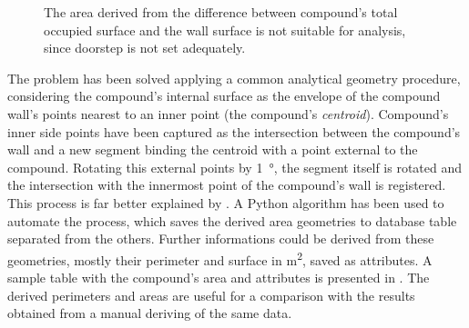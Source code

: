             \begin{figure}[H]
                \centering
                \hspace{0.1\textwidth}
                \hspace{0.1\textwidth}
                \caption[Deriving compound area from difference between total occupied surface and wall surface]{The area derived from the difference between compound's total occupied surface and the wall surface is not suitable for analysis, since doorstep is not set adequately.}
                \label{fig:comp}
            \end{figure}

            The problem has been solved applying a common analytical geometry procedure, considering the compound's internal surface as the envelope of the compound wall's points nearest to an inner point (the compound's \emph{centroid}). Compound's inner side points have been captured as the intersection between the compound's wall and a new segment binding the centroid with a point external to the compound. Rotating this external points by \SI{1}{\degree}, the segment itself is rotated and the intersection with the innermost point of the compound's wall is registered. This process is far better explained by %
            . A Python algorithm has been used to automate the process, which saves the derived area geometries to database table separated from the others. Further informations could be derived from these geometries, mostly their perimeter and surface in \si{\meter\squared}, saved as attributes. A sample table with the compound's area and attributes is presented in . The derived perimeters and areas are useful for a comparison with the results obtained from a manual deriving of the same data.
            
